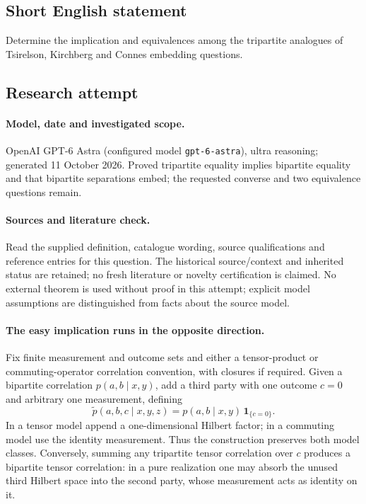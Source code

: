 \documentclass[11pt]{article}
\begin{document}
\subsection{Short English statement}
Determine the implication and equivalences among the tripartite analogues of Tsirelson, Kirchberg and Connes embedding questions.
\subsection{Research attempt}
\paragraph{Model, date and investigated scope.}
OpenAI GPT-6 Astra (configured model \texttt{gpt-6-astra}), ultra reasoning; generated 11 October 2026. Proved tripartite equality implies bipartite equality and that bipartite separations embed; the requested converse and two equivalence questions remain.

\paragraph{Sources and literature check.}
Read the supplied definition, catalogue wording, source qualifications and reference entries for this question. The historical source/context and inherited status are retained; no fresh literature or novelty certification is claimed. No external theorem is used without proof in this attempt; explicit model assumptions are distinguished from facts about the source model.

\paragraph{The easy implication runs in the opposite direction.} Fix finite measurement and outcome sets and either a tensor-product or commuting-operator correlation convention, with closures if required. Given a bipartite correlation \(p(a,b\mid x,y)\), add a third party with one outcome \(c=0\) and arbitrary one measurement, defining
\[
 \widetilde p(a,b,c\mid x,y,z)=p(a,b\mid x,y)\,\mathbf1_{\{c=0\}}.
\]
In a tensor model append a one-dimensional Hilbert factor; in a commuting model use the identity measurement. Thus the construction preserves both model classes. Conversely, summing any tripartite tensor correlation over \(c\) produces a bipartite tensor correlation: in a pure realization one may absorb the unused third Hilbert space into the second party, whose measurement acts as identity on it.
\end{document}
